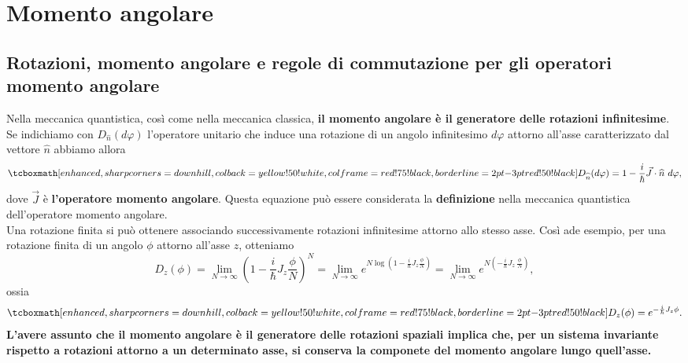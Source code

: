 \chapter{Momento angolare}
\section[Rotazioni, momento angolare e regole di commutazione]{Rotazioni, momento angolare e regole di commutazione per gli operatori momento angolare}
Nella meccanica quantistica, così come nella meccanica classica, \textbf{il momento angolare è il generatore delle rotazioni infinitesime}.\\

Se indichiamo con $D_{\widehat{n}} (d\varphi)$ l'operatore unitario che induce una rotazione di un angolo infinitesimo $d\varphi$ attorno all'asse caratterizzato dal vettore $\widehat{n}$ abbiamo allora
	\begin{equation}
		\tcboxmath[enhanced, sharp corners=downhill, colback=yellow!50!white, colframe=red!75!black, borderline={2pt}{-3pt}{red!50!black}]{
			D_{\widehat{n}} (d\varphi)=1-\frac{i}{\hbar}\vec{J}\cdot \widehat{n}\ d\varphi ,
			}
	\end{equation}
dove $\vec{J}$ è \textbf{l'operatore momento angolare}. Questa equazione può essere considerata la \textbf{definizione} nella meccanica quantistica dell'operatore momento angolare.\\

Una rotazione finita si può ottenere associando successivamente rotazioni infinitesime attorno allo stesso asse. Così ade esempio, per una rotazione finita di un angolo $\phi$ attorno all'asse $z$, otteniamo
	\begin{equation}
		D_z (\phi) = \lim _{N\rightarrow \infty} \left(1-\frac{i}{\hbar} J_z \frac{\phi}{N}\right) ^N= \lim _{N\rightarrow \infty} e^{N\log\left(1-\frac{i}{\hbar} J_z \frac{\phi}{N}\right)}= \lim _{N\rightarrow \infty} e^{N\left(-\frac{i}{\hbar} J_z \ \frac{\phi}{N}\right)},
	\end{equation}
ossia
	\begin{equation}
		\tcboxmath[enhanced, sharp corners=downhill, colback=yellow!50!white, colframe=red!75!black, borderline={2pt}{-3pt}{red!50!black}]{
			D_z (\phi)=e^{-\frac{i}{\hbar} J_z \phi}.
			}
	\end{equation}
\textbf{L'avere assunto che il momento angolare è il generatore delle rotazioni spaziali implica che, per un sistema invariante rispetto a rotazioni attorno a un determinato asse, si conserva la componete del momento angolare lungo quell'asse.}\\

